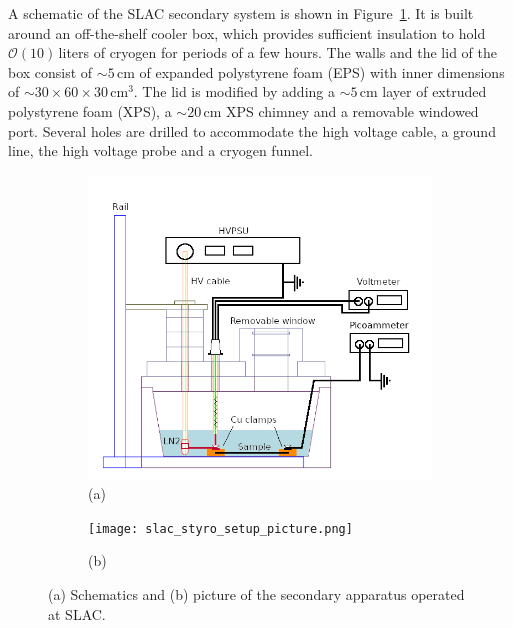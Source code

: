 \documentclass[a4paper,12pt]{article}
\begin{document}
A schematic of the SLAC secondary system is shown in Figure~\ref{fig:slac_styro_setup}. It is built around an off-the-shelf cooler box, which provides sufficient insulation to hold $\mathcal{O}(10)$\,liters of cryogen for periods of a few hours. The walls and the lid of the box consist of $\sim5$\,cm of expanded polystyrene foam (EPS) with inner dimensions of $\sim30\times60\times30$\,cm$^3$. The lid is modified by adding a $\sim5$\,cm layer of extruded polystyrene foam (XPS), a $\sim20$\,cm XPS chimney and a removable windowed port. Several holes are drilled to accommodate the high voltage cable, a ground line, the high voltage probe and a cryogen funnel.

\begin{figure}[htb]
\centering
\begin{subfigure}[c]{0.49\linewidth}
	\begin{center}
		\includegraphics[width=\linewidth]{slac_styro_setup.png}
		(a)
	\end{center}
\end{subfigure}
\begin{subfigure}[c]{0.49\linewidth}
	\begin{center}
		\vspace*{1em}
		
		\texttt{[image: slac\_styro\_setup\_picture.png]}
		\vspace*{0.5em}
		
		(b)
	\end{center}
\end{subfigure}
\caption{(a) Schematics and (b) picture of the secondary apparatus operated at SLAC.}
\label{fig:slac_styro_setup}
\end{figure}
\end{document}
